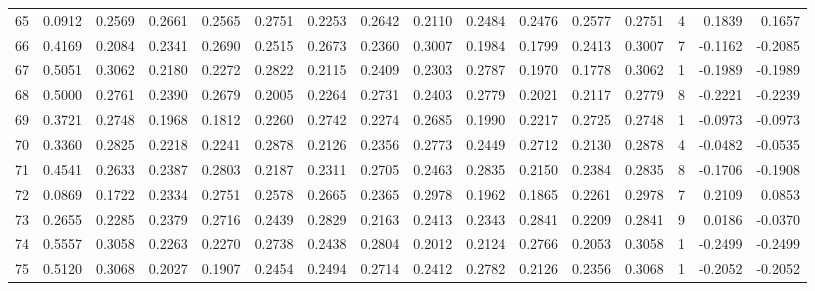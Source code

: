 \begin{tabular}{lrrrrrrrrrrrrrrr}
65  &      0.0912 &  0.2569 &  0.2661 &  0.2565 &  0.2751 &  0.2253 &  0.2642 &  0.2110 &  0.2484 &  0.2476 &   0.2577 &     0.2751 &      4 &                    0.1839 &                     0.1657 \\
66  &      0.4169 &  0.2084 &  0.2341 &  0.2690 &  0.2515 &  0.2673 &  0.2360 &  0.3007 &  0.1984 &  0.1799 &   0.2413 &     0.3007 &      7 &                   -0.1162 &                    -0.2085 \\
67  &      0.5051 &  0.3062 &  0.2180 &  0.2272 &  0.2822 &  0.2115 &  0.2409 &  0.2303 &  0.2787 &  0.1970 &   0.1778 &     0.3062 &      1 &                   -0.1989 &                    -0.1989 \\
68  &      0.5000 &  0.2761 &  0.2390 &  0.2679 &  0.2005 &  0.2264 &  0.2731 &  0.2403 &  0.2779 &  0.2021 &   0.2117 &     0.2779 &      8 &                   -0.2221 &                    -0.2239 \\
69  &      0.3721 &  0.2748 &  0.1968 &  0.1812 &  0.2260 &  0.2742 &  0.2274 &  0.2685 &  0.1990 &  0.2217 &   0.2725 &     0.2748 &      1 &                   -0.0973 &                    -0.0973 \\
70  &      0.3360 &  0.2825 &  0.2218 &  0.2241 &  0.2878 &  0.2126 &  0.2356 &  0.2773 &  0.2449 &  0.2712 &   0.2130 &     0.2878 &      4 &                   -0.0482 &                    -0.0535 \\
71  &      0.4541 &  0.2633 &  0.2387 &  0.2803 &  0.2187 &  0.2311 &  0.2705 &  0.2463 &  0.2835 &  0.2150 &   0.2384 &     0.2835 &      8 &                   -0.1706 &                    -0.1908 \\
72  &      0.0869 &  0.1722 &  0.2334 &  0.2751 &  0.2578 &  0.2665 &  0.2365 &  0.2978 &  0.1962 &  0.1865 &   0.2261 &     0.2978 &      7 &                    0.2109 &                     0.0853 \\
73  &      0.2655 &  0.2285 &  0.2379 &  0.2716 &  0.2439 &  0.2829 &  0.2163 &  0.2413 &  0.2343 &  0.2841 &   0.2209 &     0.2841 &      9 &                    0.0186 &                    -0.0370 \\
74  &      0.5557 &  0.3058 &  0.2263 &  0.2270 &  0.2738 &  0.2438 &  0.2804 &  0.2012 &  0.2124 &  0.2766 &   0.2053 &     0.3058 &      1 &                   -0.2499 &                    -0.2499 \\
75  &      0.5120 &  0.3068 &  0.2027 &  0.1907 &  0.2454 &  0.2494 &  0.2714 &  0.2412 &  0.2782 &  0.2126 &   0.2356 &     0.3068 &      1 &                   -0.2052 &                    -0.2052 \\

\end{tabular}
